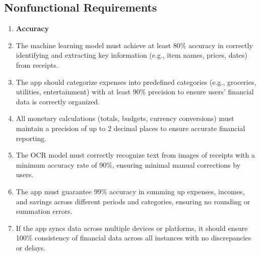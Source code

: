 \documentclass[12pt]{article}
\begin{document}
\subsection{Nonfunctional Requirements}
\begin{enumerate}[label=NFR\arabic*]
  \item[] \textbf{Accuracy}
  \item The machine learning model must achieve at least 80\% accuracy in
  correctly identifying and extracting key information (e.g., item names,
  prices, dates) from receipts.
  \item The app should categorize expenses into predefined categories (e.g.,
  groceries, utilities, entertainment) with at least 90\% precision to ensure
  users' financial data is correctly organized.
  \item All monetary calculations (totals, budgets, currency conversions) must
  maintain a precision of up to 2 decimal places to ensure accurate financial
  reporting.
  \item The OCR model must correctly recognize text from images of
  receipts with a minimum accuracy rate of 90\%, ensuring minimal manual
  corrections by users.
  \item The app must guarantee 99\% accuracy in summing up expenses, incomes,
  and savings across different periods and categories, ensuring no rounding or
  summation errors.
  \item If the app syncs data across multiple devices or platforms, it should
  ensure 100\% consistency of financial data across all instances with no
  discrepancies or delays.


\end{enumerate}
\end{document}
